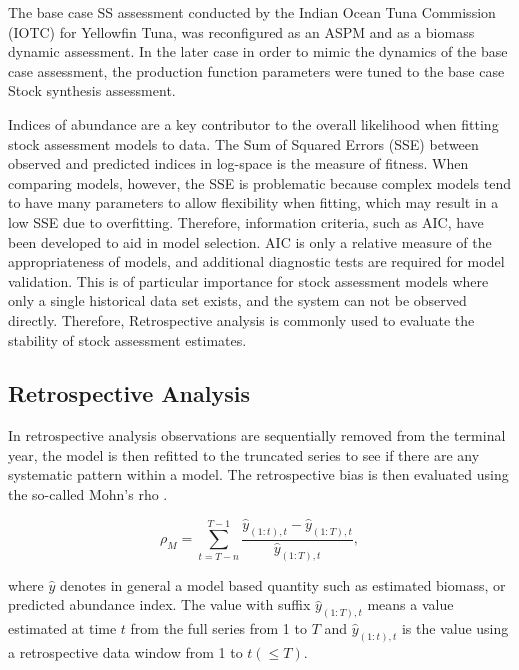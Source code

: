 \documentclass[12pt,halfline,a4paper,nonumbib]{ouparticle}
\newcommand{\disp}{\displaystyle}
\begin{document}
The base case SS assessment conducted by the Indian Ocean Tuna Commission (IOTC) for Yellowfin Tuna, was reconfigured as an ASPM and as a biomass dynamic assessment. In the later case in order to mimic the dynamics of the base case assessment, the production function parameters were tuned to the base case Stock synthesis assessment. 

Indices of abundance are a key contributor to the overall likelihood when fitting stock assessment models to data. The Sum of Squared Errors (SSE) between observed and predicted indices in log-space is the measure of fitness. When comparing models, however, the SSE is problematic because complex models tend to have many parameters to allow flexibility when fitting, which may result in a low SSE due to overfitting. Therefore, information criteria, such as AIC, have been developed to aid in model selection. AIC is only a relative measure of the appropriateness of models, and additional diagnostic tests are required for model validation. This is of particular importance for stock assessment models where only a single historical data set exists, and the system can not be observed directly. Therefore, Retrospective analysis \parencite{hurtado2014looking} is commonly used to evaluate the stability of stock assessment estimates.

\subsection{Retrospective Analysis}

In retrospective analysis observations are sequentially removed from the terminal year, the model is then refitted to the truncated series to see if there are any systematic pattern within a model. The retrospective bias is then evaluated using the so-called Mohn's rho  \parencite{mohn1999retrospective}.

\begin{equation}
\label{eqn:mohn0}
\rho_M = \disp \sum_{t=T-n}^{T-1} \frac{\hat{y}_{(1:t),t}-\hat{y}_{(1:T),t}}{\hat{y}_{(1:T),t}}, 
\end{equation}

\noindent
where $\hat{y}$ denotes in general a model based quantity such as estimated biomass, or predicted abundance index. The value with suffix $\hat{y}_{(1:T),t}$ means a value estimated at time $t$ from the full series from 1 to $T$ and  $\hat{y}_{(1:t),t}$ is the value using a retrospective data window from 1 to $t (\leq T)$. 
\end{document}
